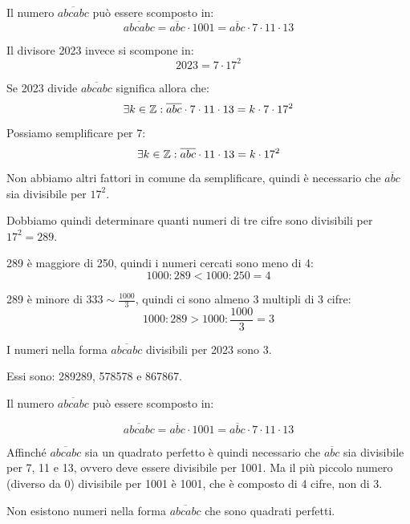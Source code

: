 \begin{soluzione}
    Il numero $\overline{abcabc}$ può essere scomposto in:
    \begin{equation*}
        \overline{abcabc} = \overline{abc} \cdot 1001 = \overline{abc} \cdot 7 \cdot 11 \cdot 13
    \end{equation*}

    Il divisore 2023 invece si scompone in:
    \begin{equation*}
        2023 = 7 \cdot 17^2
    \end{equation*}

    Se 2023 divide $\overline{abcabc}$ significa allora che:
    \begin{equation*}
        \exists k \in  \mathbb{Z} : \overline{abc} \cdot 7 \cdot 11 \cdot 13 = k \cdot 7 \cdot 17^2
    \end{equation*}

    Possiamo semplificare per 7:
    \begin{equation*}
        \exists k \in  \mathbb{Z} : \overline{abc} \cdot 11 \cdot 13 = k \cdot 17^2
    \end{equation*}

    Non abbiamo altri fattori in comune da semplificare, quindi è necessario che $\overline{abc}$ sia divisibile per
    $17^2$.

    Dobbiamo quindi determinare quanti numeri di tre cifre sono divisibili per $17^2 = 289$.

    289 è maggiore di 250, quindi i numeri cercati sono meno di 4:
    \begin{equation*}
        1000 : 289 < 1000 : 250 = 4
    \end{equation*}

    289 è minore di $333 \sim \frac{1000}{3}$, quindi ci sono almeno 3 multipli di 3 cifre:
    \begin{equation*}
        1000 : 289 > 1000 : \frac{1000}{3} = 3
    \end{equation*}

    \bigskip
    I numeri nella forma $\overline{abcabc}$ divisibili per 2023 sono 3.

    Essi sono: 289289, 578578 e 867867.
\end{soluzione}

\begin{soluzione}
    Il numero $\overline{abcabc}$ può essere scomposto in:

    \begin{equation*}
        \overline{abcabc} = \overline{abc} \cdot 1001 = \overline{abc} \cdot 7 \cdot 11 \cdot 13
    \end{equation*}

    Affinché $\overline{abcabc}$ sia un quadrato perfetto è quindi necessario che $\overline{abc}$ sia divisibile per
    7, 11 e 13, ovvero deve essere divisibile per 1001.
    Ma il più piccolo numero (diverso da 0) divisibile per 1001 è 1001, che è composto di 4 cifre, non di 3.

    \bigskip
    Non esistono numeri nella forma $\overline{abcabc}$ che sono quadrati perfetti.
\end{soluzione}
